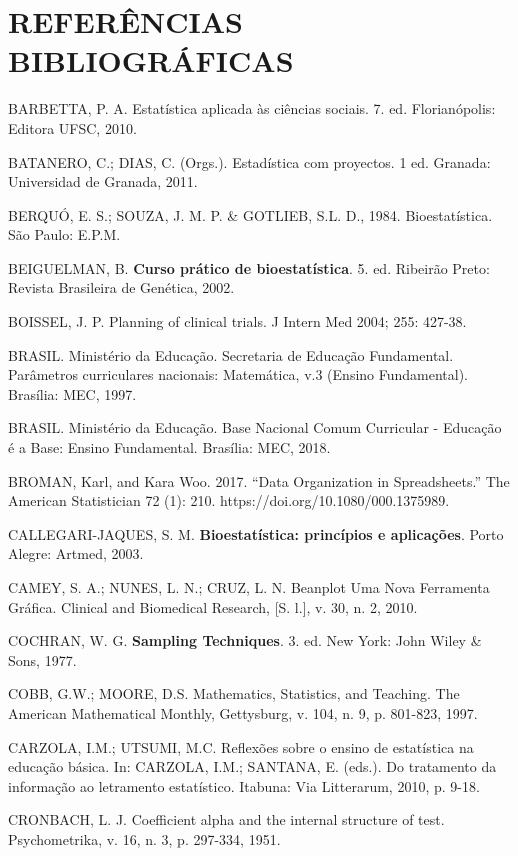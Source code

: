 \chapter{REFERÊNCIAS BIBLIOGRÁFICAS}

BARBETTA, P. A. Estatística aplicada às ciências sociais. 7. ed. Florianópolis: Editora UFSC, 2010.\vskip0.3cm

BATANERO, C.; DIAS, C. (Orgs.). Estadística com proyectos. 1 ed. Granada: Universidad de Granada, 2011.\vskip0.3cm

BERQUÓ, E. S.; SOUZA, J. M. P. \& GOTLIEB, S.L. D., 1984. Bioestatística. São Paulo: E.P.M. \vskip0.3cm

BEIGUELMAN, B. \textbf{Curso prático de bioestatística}. 5. ed. Ribeirão Preto: Revista Brasileira de Genética, 2002. \vskip0.3cm

BOISSEL, J. P. Planning of clinical trials. J Intern Med 2004; 255: 427-38.\vskip0.3cm

BRASIL. Ministério da Educação. Secretaria de Educação Fundamental. Parâmetros curriculares nacionais: Matemática, v.3 (Ensino Fundamental). Brasília: MEC, 1997. \vskip0.3cm

BRASIL. Ministério da Educação. Base Nacional Comum Curricular - Educação é a Base: Ensino Fundamental. Brasília: MEC, 2018.\vskip0.3cm

BROMAN, Karl, and Kara Woo. 2017. “Data Organization in Spreadsheets.” The American Statistician 72 (1): 210. https://doi.org/10.1080/000.1375989.\vskip0.3cm

CALLEGARI-JAQUES, S. M. \textbf{Bioestatística: princípios e aplicações}. Porto Alegre: Artmed, 2003. \vskip0.3cm

CAMEY, S. A.; NUNES, L. N.; CRUZ, L. N. Beanplot Uma Nova Ferramenta Gráfica. Clinical and Biomedical Research, [S. l.], v. 30, n. 2, 2010.\vskip0.3cm

COCHRAN, W. G. \textbf{Sampling Techniques}. 3. ed. New York: John Wiley \& Sons, 1977. \vskip0.3cm

COBB, G.W.; MOORE, D.S. Mathematics, Statistics, and Teaching. The American Mathematical Monthly, Gettysburg, v. 104, n. 9, p. 801-823, 1997.\vskip0.3cm

\newpage
CARZOLA, I.M.; UTSUMI, M.C. Reflexões sobre o ensino de estatística na educação básica. In: CARZOLA, I.M.; SANTANA, E. (eds.). Do tratamento da informação ao letramento estatístico. Itabuna: Via Litterarum, 2010, p. 9-18.\vskip0.3cm

CRONBACH, L. J. Coefficient alpha and the internal structure of test. Psychometrika, v. 16, n. 3, p. 297-334, 1951.\vskip0.3cm

